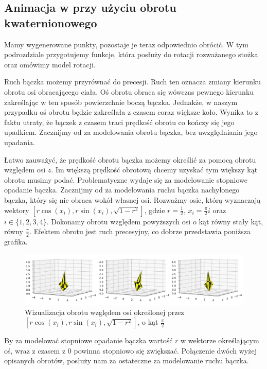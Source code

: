 \documentclass[a4paper,twoside,11pt,reqno]{mwrep}
\theoremstyle{plain} \newtheorem{twr}{Twierdzenie}
\theoremstyle{plain} \newtheorem{lem}{Lemat}
\theoremstyle{definition} \newtheorem{defi}{Definicja}
\theoremstyle{remark} \newtheorem*{wni}{Wniosek}
\theoremstyle{definition} \newtheorem{uwaga}{Uwaga}
\theoremstyle{definition}\newtheorem{prz}{Przykład}
\begin{document}
\subsection{Animacja w przy użyciu obrotu kwaternionowego}
Mamy wygenerowane punkty, pozostaje je teraz odpowiednio obrócić. W tym podrozdziale przygotujemy funkcje,
która posłuży do rotacji rozważanego stożka oraz omówimy model rotacji.

Ruch bączka możemy przyrównać do precesji. Ruch ten oznacza zmiany kierunku obrotu osi obracającego ciała. 
Oś obrotu obraca się wówczas pewnego kierunku zakreślając w ten sposób powierzchnie boczą bączka. Jednakże,
w naszym przypadku oś obrotu będzie zakreślała z czasem coraz większe koło. Wynika to z faktu utraty, 
że bączek z czasem traci prędkość obrotu co kończy się jego upadkiem. Zacznijmy od za modelowania 
obrotu bączka, bez uwzględniania jego upadania.

Łatwo zauważyć, że prędkość obrotu bączka możemy określić za pomocą obrotu względem osi $z$. Im większą prędkość obrotową chcemy uzyskać tym większy kąt obrotu musimy podać. Problematyczne wydaje się za modelowanie stopniowe
opadanie bączka. Zacznijmy od za modelowania ruchu bączka nachylonego bączka, który się nie obraca wokół własnej osi. Rozważmy osie, którą wyznaczają wektory $[r\cos(x_i),r\sin(x_i),\sqrt{1-r^2}]$, gdzie
$r = \frac{1}{2}$, $x_i=\frac{\pi}{2}i$ oraz $i\in\{1,2,3,4\}$. Dokonamy obrotu względem powyższych osi 
o kąt równy stały kąt, równy $\frac{\pi}{2}$. Efektem obrotu jest ruch precesyjny, co dobrze przedstawia 
poniższa grafika.
\begin{figure}[h]
\begin{center}
\includegraphics[width=15 cm]{precesja.png}
\caption{Wizualizacja obrotu względem osi określonej przez $\left[r\cos(x_i),r\sin(x_i),\sqrt{1-r^2}\right]$, o kąt
 $\frac{\pi}{2}$}
\end{center}
\end{figure}
By za modelować stopniowe opadanie bączka wartość $r$ w wektorze określającym oś, wraz z czasem z $0$
powinna stopniowo się zwiększać. Połączenie dwóch wyżej opisanych obrotów, posłuży nam za ostateczne za modelowanie ruchu bączka.
\end{document}
